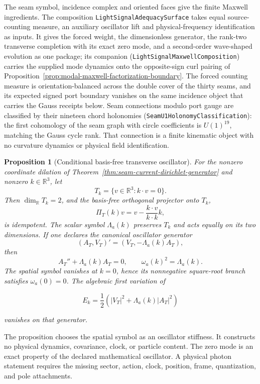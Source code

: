 \documentclass[11pt]{article}
\newtheorem{proposition}[theorem]{Proposition}
\theoremstyle{remark}
\theoremstyle{plain}
\begin{document}
The seam symbol, incidence complex and oriented faces give the finite
Maxwell ingredients. The composition \texttt{LightSignalAdequacySurface}
takes equal source-counting measure, an auxiliary oscillator lift and
physical-frequency identification as inputs. It gives the
forced weight, the dimensionless generator, the rank-two transverse
completion with its exact zero mode, and a second-order wave-shaped evolution
as one package; its companion (\texttt{LightSignalMaxwellComposition})
carries the supplied mode dynamics onto the opposite-sign curl pairing of
Proposition~\ref{prop:modal-maxwell-factorization-boundary}. The forced
counting measure is orientation-balanced across the double cover of the
thirty seams, and its expected signed port boundary vanishes on the same
incidence object that carries the Gauss receipts below. Seam connections
modulo port gauge are classified by their nineteen chord holonomies
(\texttt{SeamU1HolonomyClassification}): the first cohomology of the seam
graph with circle coefficients is \(U(1)^{19}\), matching the Gauss cycle
rank. That connection is a finite kinematic object with no curvature
dynamics or physical field identification.

\begin{proposition}[Conditional basis-free transverse oscillator]
\label{prop:seam-current-transverse-oscillator}
For the nonzero coordinate dilation of
Theorem~\ref{thm:seam-current-dirichlet-generator} and nonzero
\(k\in\mathbb R^3\), let
\[
T_k=\{v\in\mathbb R^3:k\mathbin{\cdot}v=0\}.
\]
Then \(\dim_{\mathbb R}T_k=2\), and the basis-free orthogonal projector onto
\(T_k\),
\[
\Pi_T(k)v=v-\frac{k\mathbin{\cdot}v}{k\mathbin{\cdot}k}k,
\]
is idempotent. The scalar symbol
\(\Lambda_a(k)\) preserves \(T_k\) and acts equally on its two dimensions. If
one declares the canonical oscillator generator
\[
(A_T,V_T)'=(V_T,-\Lambda_a(k)A_T),
\]
then
\[
A_T''+\Lambda_a(k)A_T=0,
\qquad \omega_a(k)^2=\Lambda_a(k).
\]
The spatial symbol vanishes at \(k=0\), hence its nonnegative square-root
branch satisfies \(\omega_a(0)=0\).
The algebraic first variation of

\[
E_k=\frac12\left(|V_T|^2+\Lambda_a(k)|A_T|^2\right)
\]

vanishes on that generator.
\end{proposition}

The proposition chooses the spatial symbol as an oscillator stiffness. It
constructs no physical dynamics, covariance, clock, or particle content. The zero mode is an exact property of the declared
mathematical oscillator. A physical photon statement requires the missing
sector, action, clock, position, frame, quantization, and pole attachments.
\end{document}
